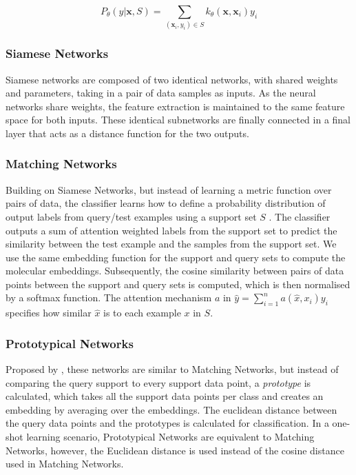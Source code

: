 \begin{equation}
	\label{kernel}
	P_\theta(y \vert \mathbf{x}, S) = \sum_{(\mathbf{x}_i, y_i) \in S} k_\theta(\mathbf{x}, \mathbf{x}_i)y_i
\end{equation}

\subsubsection{Siamese Networks}

Siamese networks \cite{bromley1993signature, koch2015siamese} are composed of two identical networks, with shared weights and parameters, taking in a pair of data samples as inputs. As the neural networks share weights, the feature extraction is maintained to the same feature space for both inputs. These identical subnetworks are finally connected in a final layer that acts as a distance function for the two outputs.

\subsubsection{Matching Networks}

Building on Siamese Networks, but instead of learning a metric function over pairs of data, the classifier learns how to define a probability distribution of output labels from query/test examples using a support set $S$ \cite{vinyals2016matching}. The classifier outputs a sum of attention weighted labels from the support set to predict the similarity between the test example and the samples from the support set. We use the same embedding function for the support and query sets to compute the molecular embeddings. Subsequently, the cosine similarity between pairs of data points between the support and query sets is computed, which is then normalised by a softmax function. The attention mechanism $a$ in $\hat{y} = \sum_{i=1}^{n} a(\hat{x}, x_i)y_i$ specifies how similar $\hat{x}$ is to each example $x$ in $S$.

\subsubsection{Prototypical Networks}

Proposed by \citet{snell2017prototypical}, these networks are similar to Matching Networks, but instead of comparing the query support to every support data point, a \textit{prototype} is calculated, which takes all the support data points per class and creates an embedding by averaging over the embeddings. The euclidean distance between the query data points and the prototypes is calculated for classification. In a one-shot learning scenario, Prototypical Networks are equivalent to Matching Networks, however, the Euclidean distance is used instead of the cosine distance used in Matching Networks.

